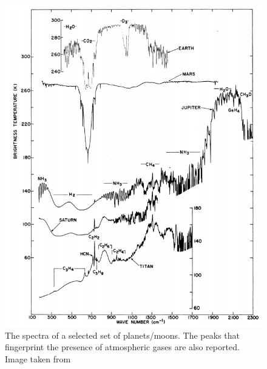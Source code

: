 \documentclass[
12pt, %
a4paper, %
oneside, %
headinclude,footinclude, %
BCOR5mm, %
]{scrartcl}
\begin{document}
\begin{figure}[h]
\begin{center}
\includegraphics[width=1\textwidth]{Pic/Absorption_gas.png}
\caption{The spectra of a selected set of planets/moons. The peaks that fingerprint the presence of atmospheric gases are also reported. Image taken from \cite{catling2017atmospheric}}
\label{BlackBody_greenhouse_2}
\end{center}
\end{figure}
\end{document}
